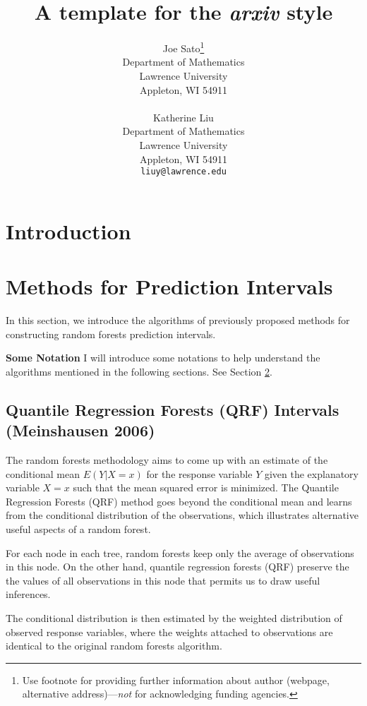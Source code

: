 \documentclass{article}
\title{A template for the \emph{arxiv} style}
\author{
  Joe Sato\thanks{Use footnote for providing further
    information about author (webpage, alternative
    address)---\emph{not} for acknowledging funding agencies.} \\
  Department of Mathematics\\
  Lawrence University\\
  Appleton, WI 54911 \\
  \texttt{} \\
   \And
 Katherine Liu \\
  Department of Mathematics \\
  Lawrence University\\
  Appleton, WI 54911 \\
  \texttt{liuy@lawrence.edu} \\
}
\begin{document}
\maketitle

\begin{abstract}

\end{abstract}




\section{Introduction}


\section{Methods for Prediction Intervals}
\label{sec:headings}
In this section, we introduce the algorithms of previously proposed methods for constructing random forests prediction intervals.  

\textbf{Some Notation} I will introduce some notations to help understand the algorithms mentioned in the following sections. 
See Section \ref{sec:headings}.

\subsection{Quantile Regression Forests (QRF) Intervals (Meinshausen 2006)}
The random forests methodology aims to come up with an estimate of the conditional mean $E(Y|X = x)$ for the response variable $Y$ given the explanatory variable $X = x$ such that the mean squared error is minimized. The Quantile Regression Forests (QRF) method goes beyond the conditional mean and learns from the conditional distribution of the observations, which illustrates alternative useful aspects of a random forest. 

For each node in each tree, random forests keep only the average of observations in this node. On the other hand, quantile regression forests (QRF) preserve the the values of all observations in this node that permits us to draw useful inferences. 



The conditional distribution is then estimated by the weighted distribution of observed response variables, where the weights attached to observations are identical to the original random forests algorithm.
\end{document}
